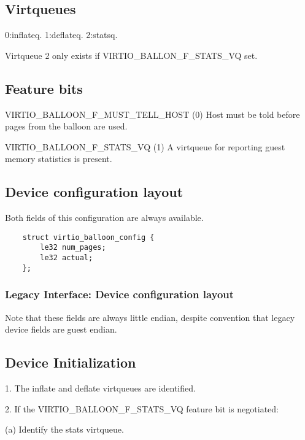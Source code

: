 \subsection{Virtqueues}\label{sec:Device Types / Memory Balloon Device / Virtqueues}
  0:inflateq. 1:deflateq. 2:statsq.

  Virtqueue 2 only exists if VIRTIO_BALLON_F_STATS_VQ set.

\subsection{Feature bits}\label{sec:Device Types / Memory Balloon Device / Feature bits}
  VIRTIO_BALLOON_F_MUST_TELL_HOST (0) Host must be told before
    pages from the balloon are used.

  VIRTIO_BALLOON_F_STATS_VQ (1) A virtqueue for reporting guest
    memory statistics is present.

\subsection{Device configuration layout}\label{sec:Device Types / Memory Balloon Device / Device configuration layout}
  Both fields of this configuration
  are always available.

\begin{lstlisting}
	struct virtio_balloon_config {
		le32 num_pages;
		le32 actual;
	};
\end{lstlisting}

\subsubsection{Legacy Interface: Device configuration layout}\label{sec:Device Types / Memory Balloon Device / Device configuration layout / Legacy Interface: Device configuration layout}
Note that these fields are always little endian, despite convention
that legacy device fields are guest endian.

\subsection{Device Initialization}\label{sec:Device Types / Memory Balloon Device / Device Initialization}

1. The inflate and deflate virtqueues are identified.

2. If the VIRTIO_BALLOON_F_STATS_VQ feature bit is negotiated:

  (a) Identify the stats virtqueue.

